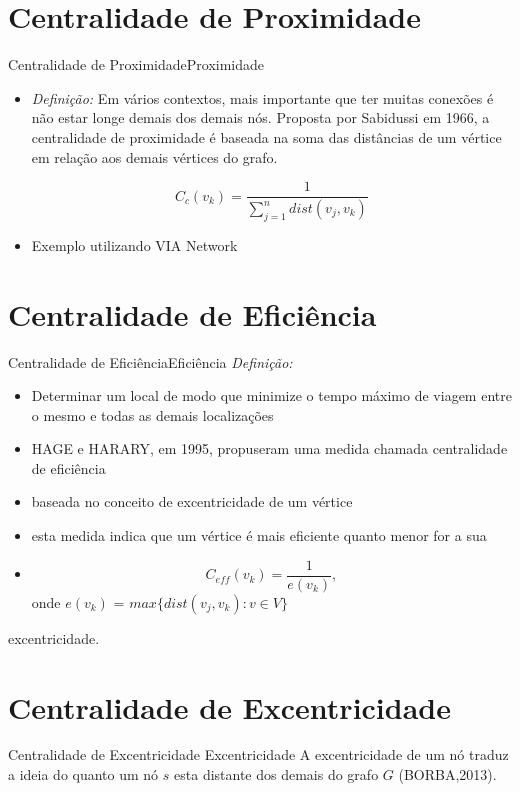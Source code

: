 \documentclass[10pt]{beamer}
\begin{document}
\section{Centralidade de Proximidade}
\begin{frame}{Centralidade de Proximidade}{Proximidade}
\begin{itemize}
\item \textit{Definição:} Em vários contextos, mais importante que ter muitas conexões é não estar longe demais dos demais nós. Proposta por Sabidussi em 1966, a centralidade de proximidade é baseada na soma das distâncias de um vértice em relação aos demais vértices do grafo.

\begin{equation}
C_c(v_k) = \frac{1}{\sum_{j = 1}^n dist(v_j,v_k)} 
\end{equation}
\item Exemplo utilizando VIA Network
\end{itemize}
\end{frame}


\section{Centralidade de Eficiência}
\begin{frame}{Centralidade de Eficiência}{Eficiência}
\textit{Definição: }
\begin{itemize}
\item Determinar um local de modo que minimize o tempo máximo de viagem entre o mesmo 
e todas as demais localizações
\item HAGE e HARARY, em 1995, propuseram uma medida chamada centralidade de eficiência
\item baseada  no  conceito  de  excentricidade  de  um  vértice
\item esta medida indica que um vértice é mais eficiente quanto menor for a sua 
\item \begin{equation}
C_{eff}(v_k)= \frac{1}{e(v_k)},
\end{equation}
onde $e(v_k)$ = $max\{dist(v_j,v_k):v \in V\}$
\end{itemize}

excentricidade.
\end{frame}

\section{Centralidade de Excentricidade}
\begin{frame}{Centralidade de Excentricidade }{Excentricidade}
A excentricidade de um nó traduz a ideia do quanto um nó $s$ esta distante dos demais do grafo $G$ (BORBA,2013).
\end{frame}
\end{document}

